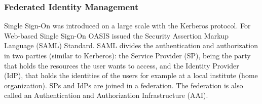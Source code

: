 \documentclass[12pt]{report}
\begin{document}
	\subsubsection{Federated Identity Management}
		Single Sign-On was introduced on a large scale with the Kerberos protocol. For Web-based Single Sign-On OASIS issued the Security Assertion Markup Language (SAML) Standard. SAML divides the authentication and authorization in two parties (similar to Kerberos): the Service Provider (SP), being the party that holds the resources the user wants to access, and the Identity Provider (IdP), that holds the identities of the users for example at a local institute (home organization). SPs and IdPs are joined in a federation. The federation is also called an Authentication and Authorization Infrastructure (AAI). \newline
		
\end{document}
